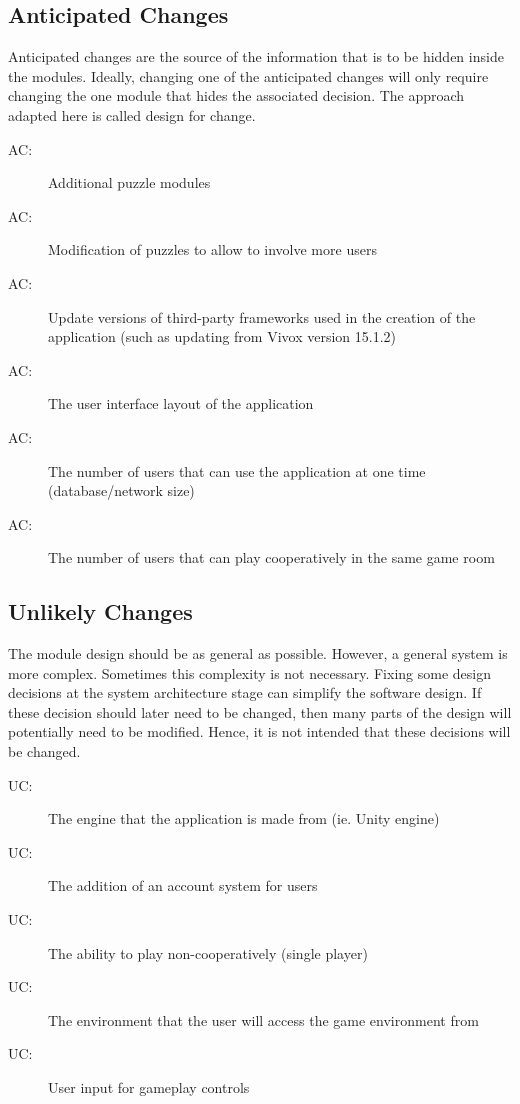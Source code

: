 \documentclass[12pt, titlepage]{article}
\newcounter{acnum}
\newcommand{\actheacnum}{AC\theacnum}
\newcounter{ucnum}
\newcommand{\uctheucnum}{UC\theucnum}
\begin{document}
\subsection{Anticipated Changes} \label{SecAchange}

Anticipated changes are the source of the information that is to be hidden
inside the modules. Ideally, changing one of the anticipated changes will only
require changing the one module that hides the associated decision. The approach
adapted here is called design for
change.

\begin{description}
\item[ \actheacnum \label{acInput2}:] Additional puzzle modules
\item[ \actheacnum \label{acInput3}:] Modification of puzzles to allow to involve more users
\item[ \actheacnum \label{acInput4}:] Update versions of third-party frameworks used in the creation of the application (such as updating from Vivox version 15.1.2)
\item[ \actheacnum \label{acInput5}:] The user interface layout of the application
\item[ \actheacnum \label{acInput6}:] The number of users that can use the application at one time (database/network size)
\item[ \actheacnum \label{acInput7}:] The number of users that can play cooperatively in the same game room
\end{description}

\subsection{Unlikely Changes} \label{SecUchange}

The module design should be as general as possible. However, a general system is
more complex. Sometimes this complexity is not necessary. Fixing some design
decisions at the system architecture stage can simplify the software design. If
these decision should later need to be changed, then many parts of the design
will potentially need to be modified. Hence, it is not intended that these
decisions will be changed.

\begin{description}
\item[ \uctheucnum \label{UC1}:] The engine that the application is made from (ie. Unity engine)
\item[ \uctheucnum \label{UC2}:] The addition of an account system for users
\item[ \uctheucnum \label{UC3}:] The ability to play non-cooperatively (single player)
\item[ \uctheucnum \label{UC4}:] The environment that the user will access the game environment from
\item[ \uctheucnum \label{UC5}:] User input for gameplay controls
\end{description}
\end{document}
